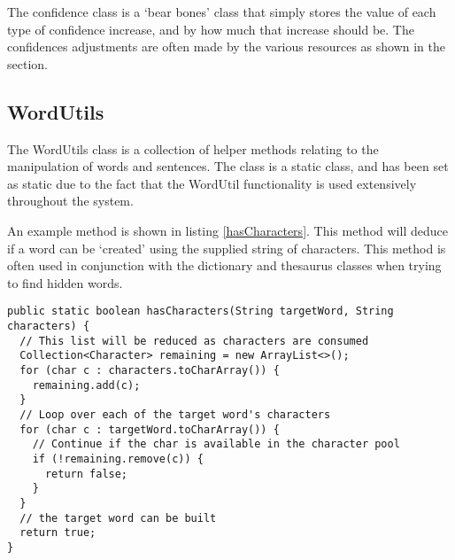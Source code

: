 The confidence class is a `bear bones' class that simply stores the value of
each type of confidence increase, and by how much that increase should be. The 
confidences adjustments are often made by the various resources as shown in the
 section.


\subsection{WordUtils}
\label{sub:wordutils}

The WordUtils class is a collection of helper methods relating to the 
manipulation of words and sentences. The class is a static class, and has been 
set as static due to the fact that the WordUtil functionality is used 
extensively throughout the system.

An example method is shown in listing \ref{hasCharacters}. This method will 
deduce if a word can be `created' using the supplied string of characters. This
method is often used in conjunction with the dictionary and thesaurus classes
when trying to find hidden words.

\begin{lstlisting}[caption={deduces if a word can be made with a given set of 
                            unilearncharacters}, label=hasCharacters] 
public static boolean hasCharacters(String targetWord, String characters) {
  // This list will be reduced as characters are consumed
  Collection<Character> remaining = new ArrayList<>();
  for (char c : characters.toCharArray()) {
    remaining.add(c);
  }
  // Loop over each of the target word's characters
  for (char c : targetWord.toCharArray()) {
    // Continue if the char is available in the character pool
    if (!remaining.remove(c)) {
      return false;
    }
  }
  // the target word can be built
  return true;
}
\end{lstlisting}
